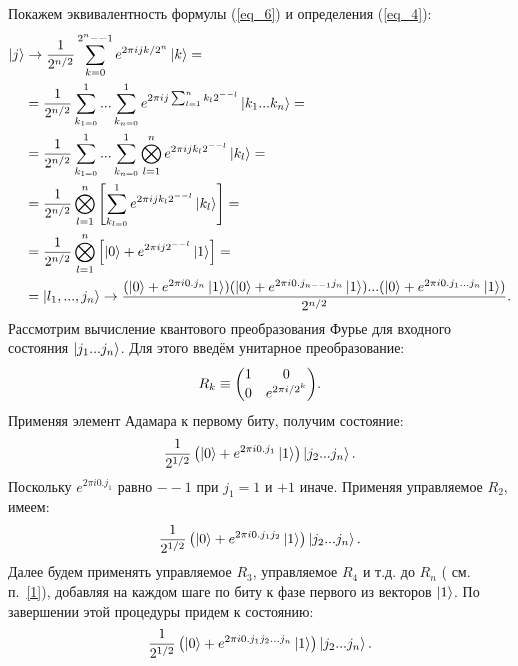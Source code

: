 \documentclass[12pt,a4paper]{article}
\begin{document}
	Покажем эквивалентность формулы (\ref{eq_6}) и определения (\ref{eq_4}):\\
	\begin{equation}\label{eq_7}	
		\begin{split} 
			\ket{j}&\rightarrow\frac{1}{2^{n/2}}\sum_{k=0}^{2^{n}--1}e^{2\pi ijk/{2^{n}}}\ket{k}=\\
			&=\frac{1}{2^{n/2}}\sum_{k_{1=0}}^{1}...\sum_{k_{n=0}}^{1}e^{2\pi ij\sum_{l=1}^{n}k_{l}{2^{--l}}}\ket{k_{1}...k_{n}}=\\
			&=\frac{1}{2^{n/2}}\sum_{k_{1=0}}^{1}...\sum_{k_{n=0}}^{1}\bigotimes_{l=1}^{n}e^{2\pi ijk_{l}{2^{--l}}}\ket{k_{l}}=\\
			&=\frac{1}{2^{n/2}}\bigotimes_{l=1}^{n}\left[\sum_{k_{l=0}}^{1}e^{2\pi ijk_{l}{2^{--l}}}\ket{k_{l}}\right]=\\
			&=\frac{1}{2^{n/2}}\bigotimes_{l=1}^{n}\left[\ket{0}+e^{2\pi ij2^{--l}}\ket{1}\right]=\\
			&=\ket{l_{1},...,j_{n}}\rightarrow\frac{(\ket{0}+e^{2\pi i0.j_{n}}\ket{1})(\ket{0}+e^{2\pi i0.j_{n--1}j_{n}}\ket{1})...(\ket{0}+e^{2\pi i0.j_{1}...j_{n}}\ket{1})}{2^{n/2}}.
		\end{split}
	\end{equation}
	Рассмотрим вычисление квантового преобразования Фурье для входного состояния $\ket{j_{1}...j_{n}}$. Для этого введём унитарное преобразование:\\
	\begin{equation}
		R_{k}\equiv\mqty(1&0 \\ 0&e^{2\pi i/2^{k}}).
	\end{equation}
	Применяя элемент Адамара к первому биту, получим состояние:\\
	\begin{equation}
		\frac{1}{2^{1/2}}\left(\ket{0}+e^{2\pi i0.j_{1}}\ket{1}\right)\ket{j_{2}...j_{n}}.	
	\end{equation}
	Поскольку $e^{2\pi i0.j_{1}}$ равно $--1$ при $j_{1}=1$ и $+1$ иначе. Применяя управляемое $R_{2}$, имеем:\\
	\begin{equation}
		\frac{1}{2^{1/2}}\left(\ket{0}+e^{2\pi i0.j_{1}j_{2}}\ket{1}\right)\ket{j_{2}...j_{n}}.
	\end{equation}
	Далее будем применять управляемое $R_{3}$, управляемое $R_{4}$ и т.д. до  $R_{n}$ ( см. п.~\ref{1}), добавляя на каждом шаге по биту к фазе первого из векторов $\ket{1}$. По завершении этой процедуры придем к состоянию:\\
	\begin{equation}
		\frac{1}{2^{1/2}}\left(\ket{0}+e^{2\pi i0.j_{1}j_{2}...j_{n}}\ket{1}\right)\ket{j_{2}...j_{n}}.
	\end{equation}
\end{document}
